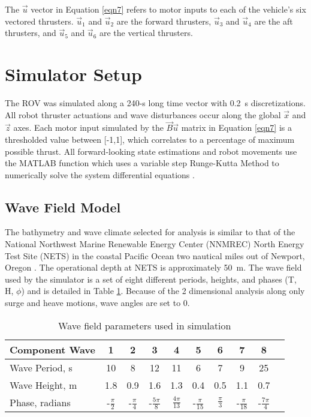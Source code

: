 \documentclass[letterpaper, 10 pt, conferences]{ieeeconf}  %
\begin{document}
The $\vec{u}$ vector in Equation \ref{eqn7} refers to motor inputs to each of the vehicle's six vectored thrusters. $\vec{u}_1$ and $\vec{u}_2$ are the forward thrusters, $\vec{u}_3$ and $\vec{u}_4$ are the aft thrusters, and $\vec{u}_5$ and $\vec{u}_6$ are the vertical thrusters.

\section{Simulator Setup}
\label{sec:sim}

The ROV was simulated along a 240-s long time vector with 0.2~s discretizations. All robot thruster actuations and wave disturbances occur along the global $\vec{x}$ and $\vec{z}$ axes. Each motor input simulated by the $\vec{B}\vec{u}$ matrix in Equation \ref{eqn7} is a thresholded value between [-1,1], which correlates to a percentage of maximum possible thrust. All forward-looking state estimations and robot movements use the MATLAB function  which uses a variable step Runge-Kutta Method to numerically solve the system differential equations \cite{ode45}.

\subsection{Wave Field Model} 

The bathymetry and wave climate selected for analysis is similar to that of the National Northwest Marine Renewable Energy Center (NNMREC) North Energy Test Site (NETS) in the coastal Pacific Ocean two nautical miles out of Newport, Oregon \cite{ling}. The operational depth at NETS is approximately 50~m. The wave field used by the simulator is a set of eight different periods, heights, and phases (T, H, $\phi$) and is detailed in Table \ref{table:waveData}. Because of the 2 dimensional analysis along only surge and heave motions, wave angles are set to 0.

\begin{table}
\caption{Wave field parameters used in simulation}
\begin{center}
\def\arraystretch{1.1}%
\begin{tabular}{ |l|c|c|c|c|c|c|c|c|c| } 
 \hline 
 Component Wave & 1 & 2 & 3 & 4 & 5 & 6 & 7 & 8 \\ 
 \hline
 Wave Period, s & 10 & 8 & 12 & 11 & 6 & 7 & 9 & 25  \\ 
 Wave Height, m & 1.8 & 0.9 & 1.6 & 1.3 & 0.4 & 0.5 & 1.1 & 0.7 \\ 
 Phase, radians & -$\frac{\pi}{2}$ & -$\frac{\pi}{4}$ & -$\frac{5\pi}{8}$ & $\frac{4\pi}{13}$ & -$\frac{\pi}{15}$ & $\frac{\pi}{3}$ & -$\frac{\pi}{18}$ & -$\frac{7\pi}{4}$\\
 \hline
\end{tabular}
\end{center}
\label{table:waveData}
\end{table}
\end{document}
